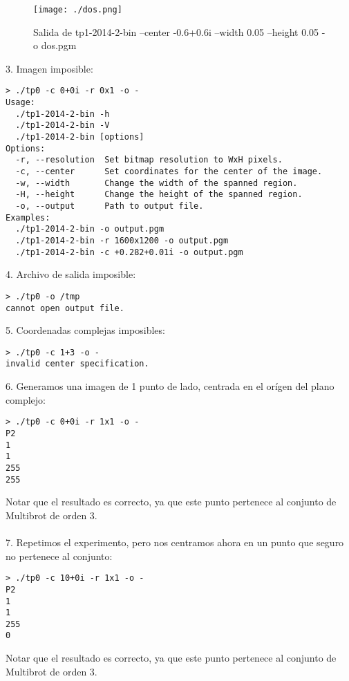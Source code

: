 \documentclass[a4paper,10pt]{article}
\begin{document}
\begin{figure}
\begin{center}
\texttt{[image: ./dos.png]}
\label{fig:Region comprendida entre -0.625+0.625i y -0.575+0.575i.}
\caption{Salida de tp1-2014-2-bin --center -0.6+0.6i --width 0.05 --height 0.05 -o dos.pgm}
\end{center}
\end{figure}

3. Imagen imposible:
\begin{verbatim}
> ./tp0 -c 0+0i -r 0x1 -o -
Usage:
  ./tp1-2014-2-bin -h
  ./tp1-2014-2-bin -V
  ./tp1-2014-2-bin [options]
Options:
  -r, --resolution  Set bitmap resolution to WxH pixels.
  -c, --center      Set coordinates for the center of the image.
  -w, --width       Change the width of the spanned region.
  -H, --height      Change the height of the spanned region.
  -o, --output      Path to output file.
Examples:
  ./tp1-2014-2-bin -o output.pgm
  ./tp1-2014-2-bin -r 1600x1200 -o output.pgm
  ./tp1-2014-2-bin -c +0.282+0.01i -o output.pgm
\end{verbatim}

4. Archivo de salida imposible:
\begin{verbatim}
> ./tp0 -o /tmp
cannot open output file.
\end{verbatim}

5. Coordenadas complejas imposibles:
\begin{verbatim}
> ./tp0 -c 1+3 -o -
invalid center specification.
\end{verbatim}

6. Generamos una imagen de 1 punto de lado, centrada en el or\'igen del plano complejo:
\begin{verbatim}
> ./tp0 -c 0+0i -r 1x1 -o -
P2
1
1
255
255
\end{verbatim}

Notar que el resultado es correcto, ya que este punto pertenece al conjunto de Multibrot de orden 3.\\
\\

7. Repetimos el experimento, pero nos centramos ahora en un punto que seguro no pertenece
al conjunto:
\begin{verbatim}
> ./tp0 -c 10+0i -r 1x1 -o -
P2
1
1
255
0
\end{verbatim}

Notar que el resultado es correcto, ya que este punto pertenece al conjunto de Multibrot de orden 3.
\\
\end{document}
